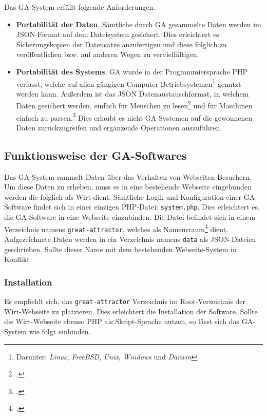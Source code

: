 Das GA-System erfüllt folgende Anforderungen.

\begin{itemize}
\item
  \textbf{Portabilität der Daten}. Sämtliche durch GA gesammelte Daten
  werden im JSON-Format auf dem Dateisystem gesichert. Dies erleichtert
  es Sicherungskopien der Datensätze anzufertigen und diese folglich zu
  veröffentlichen bzw. auf anderen Wegen zu vervielfältigen.
\item
  \textbf{Portabilität des Systems}. GA wurde in der Programmiersprache
  PHP verfasst, welche auf allen gängigen
  Computer-Betriebsystemen\footnote{Darunter: \emph{Linux}, \emph{FreeBSD}, \emph{Unix}, \emph{Windows} und
\emph{Darwin}} genutzt werden kann.
  Außerdem ist das JSON Datenaustauschformat, in welchem Daten gesichert
  werden, einfach für Menschen zu lesen\footcite{jsonDe} und für
  Maschinen einfach zu parsen.\footcite{jsonDe} Dies erlaubt es
  nicht-GA-Systemen auf die gewonnenen Daten zurückzugreifen und
  ergänzende Operationen auszuführen.
\end{itemize}

\subsection{Funktionsweise der GA-Softwares} %
\label{sub:funktionsweise_der_ga_softwares}
Das GA-System sammelt Daten über das Verhalten von Webseiten-Besuchern.
Um diese Daten zu erheben, muss es in eine bestehende Webseite
eingebunden werden die folglich als Wirt dient. Sämtliche Logik und
Konfiguration einer GA-Software findet sich in einer einzigen PHP-Datei:
\texttt{system.php}. Dies erleichtert es, die GA-Software in eine
Webseite einzubinden. Die Datei befindet sich in einem Verzeichnis
namens \texttt{great-attractor}, welches als Namensraum\footcite{wp:namensraum}
dient. Aufgezeichnete Daten werden in ein Verzeichnis namens
\texttt{data} als JSON-Dateien geschrieben. Sollte dieser Name mit dem
bestehenden Webseite-System in Konflikt

\subsubsection{Installation} %
\label{ssub:ga_installation}
Es empfiehlt sich, das \texttt{great-attractor} Verzeichnis im
Root-Verzeichnis der Wirt-Webseite zu platzieren. Dies erleichtert die
Installation der Software. Sollte die Wirt-Webseite ebenso PHP als
Skript-Sprache nutzen, so lässt sich das GA-System wie folgt einbinden.

